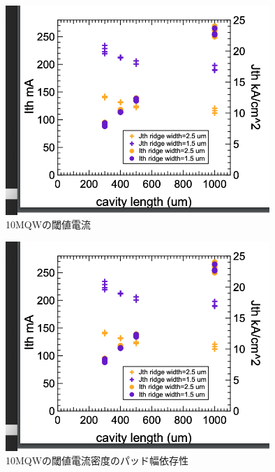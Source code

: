 \begin{figure}[h]
	\centering
	\includegraphics[width=10cm]{figure/fig_3_1_broad_i_th_10QW.png}
		\caption{10MQWの閾値電流}
		\label{fig_3_1_broad_i_th_3QW}
\end{figure}

\begin{figure}[h]
	\centering
	\includegraphics[width=10cm]{figure/fig_3_1_broad_i_th_10QW.png}
		\caption{10MQWの閾値電流密度のパッド幅依存性}
		\label{fig_3_1_broad_j_th_10QW}
\end{figure}

\newpage
